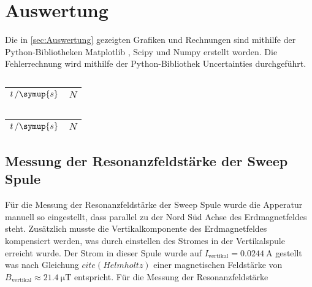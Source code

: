 \section{Auswertung}
\label{sec:Auswertung}
Die in \autoref{sec:Auswertung} gezeigten Grafiken und Rechnungen sind mithilfe der Python-Bibliotheken Matplotlib \cite{matplotlib}, Scipy \cite{scipy} und Numpy \cite{numpy}
erstellt worden. Die Fehlerrechnung wird mithilfe der Python-Bibliothek Uncertainties \cite{uncertainties} durchgeführt.
\begin{table}[H]
  \centering
  \caption{}
  \begin{tabular}{S[table-format=3] S[table-format=2(2)]}
      \toprule
      {$t\,/\symup{s}$} & {$N$} \\
      \midrule

      \bottomrule
  \end{tabular}
  \begin{tabular}{S[table-format=3] S[table-format=2(2)]}
      \toprule
      {$t\,/\symup{s}$} & {$N$} \\
      \midrule
      
      \bottomrule
  \end{tabular}
  \label{tab:}
\end{table}
\subsection{Messung der Resonanzfeldstärke der Sweep Spule}
\label{sec:Resonanzfeldstärke}
Für die Messung der Resonanzfeldstärke der Sweep Spule wurde die Apperatur manuell so eingestellt, dass parallel zu der Nord Süd Achse des Erdmagnetfeldes steht. Zusätzlich musste die Vertikalkomponente 
des Erdmagnetfeldes kompensiert werden, was durch einstellen des Stromes in der Vertikalspule erreicht wurde. Der Strom in dieser Spule wurde auf $I_{\text{vertikal}} = \SI{0.0244}{\ampere}$ gestellt  was nach Gleichung $cite(Helmholtz)$ einer magnetischen Feldstärke von $B_{\text{vertikal}} \approx \SI{21.4}{\micro\tesla}$ entspricht.
Für die Messung der Resonanzfeldstärke 
\newpage